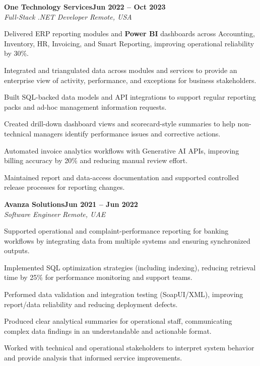 \documentclass[letterpaper,10pt]{article}
\newcommand{\headingBf}[2]{
  \hspace{10pt}\textbf{#1}\hfill\textbf{#2}\\
}
\newcommand{\headingIt}[2]{
  \hspace{10pt}\textit{#1}\hfill\textit{#2}\\
}
\newenvironment{resume_list}{
  \vspace{-7pt}
  \begin{itemize}[itemsep=-2px, parsep=1pt, leftmargin=30pt]
}{
  \end{itemize}
}
\begin{document}
\headingBf{One Technology Services}{Jun 2022 -- Oct 2023}
\headingIt{Full-Stack .NET Developer \hfill Remote, USA}{}
\begin{resume_list}
    \item Delivered ERP reporting modules and \textbf{Power BI} dashboards across Accounting, Inventory, HR, Invoicing, and Smart Reporting, improving operational reliability by 30\%.
    \item Integrated and triangulated data across modules and services to provide an enterprise view of activity, performance, and exceptions for business stakeholders.
    \item Built SQL-backed data models and API integrations to support regular reporting packs and ad-hoc management information requests.
    \item Created drill-down dashboard views and scorecard-style summaries to help non-technical managers identify performance issues and corrective actions.
    \item Automated invoice analytics workflows with Generative AI APIs, improving billing accuracy by 20\% and reducing manual review effort.
    \item Maintained report and data-access documentation and supported controlled release processes for reporting changes.
\end{resume_list}

\headingBf{Avanza Solutions}{Jun 2021 -- Jun 2022}
\headingIt{Software Engineer \hfill Remote, UAE}{}
\begin{resume_list}
    \item Supported operational and complaint-performance reporting for banking workflows by integrating data from multiple systems and ensuring synchronized outputs.
    \item Implemented SQL optimization strategies (including indexing), reducing retrieval time by 25\% for performance monitoring and support teams.
    \item Performed data validation and integration testing (SoapUI/XML), improving report/data reliability and reducing deployment defects.
    \item Produced clear analytical summaries for operational staff, communicating complex data findings in an understandable and actionable format.
    \item Worked with technical and operational stakeholders to interpret system behavior and provide analysis that informed service improvements.
\end{resume_list}
\end{document}
